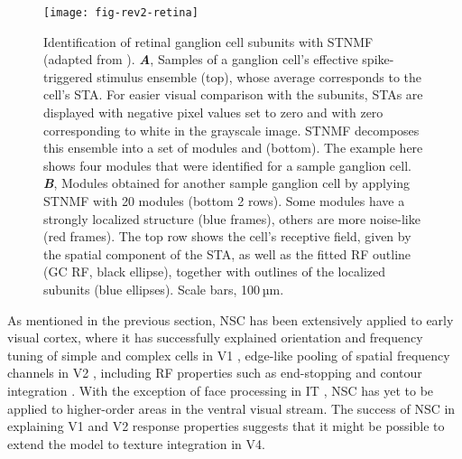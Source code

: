 \begin{figure}[ht]
	\centering
	\texttt{[image: fig-rev2-retina]}
    \caption{
    Identification of retinal ganglion cell subunits 
    with \ac{STNMF} (adapted  from \cite{Liu2017}).
    \textbf{\emph{A}},
	     Samples of a ganglion cell’s effective spike-triggered stimulus ensemble (top),
         whose average corresponds to the cell’s \ac{STA}.
         For easier visual comparison with the subunits,
         \acp{STA} are displayed with negative pixel values set to zero and
         with zero corresponding to white in the grayscale image.
         \ac{STNMF} decomposes this ensemble into a set of modules and 
          (bottom).
         The example here shows four modules that were identified for
         a sample ganglion cell.
    \textbf{\emph{B}},
         Modules obtained for another sample ganglion cell by applying \ac{STNMF}
         with 20 modules (bottom 2 rows). Some modules have a strongly localized structure 
         (blue frames), others are more noise-like (red frames).
         The top row shows the cell’s receptive field,
         given by the spatial component of the \ac{STA}, as well as the fitted \ac{RF} outline
         (GC RF, black ellipse), together with outlines of the localized subunits 
         (blue ellipses). Scale bars, 100 µm.
    }
	\label{fig:NMF|retina}
\end{figure}

As mentioned in the previous section,
\ac{NSC} has been extensively applied to early visual cortex,
where it has successfully explained 
orientation and frequency tuning of simple and complex cells in \ac{V1} \cite{Hoyer2003},
edge-like pooling of spatial frequency channels in V2 \cite{Hyvarinen2005},
including \ac{RF} properties such as end-stopping and contour integration 
\cite{HoyerHyvarinen2002}.
With the exception of face processing in \ac{IT}
\cite{LeeSeung1999,ChangTsao2017},
\ac{NSC} has yet to be applied to higher-order areas in the ventral visual stream.
The success of \ac{NSC} in explaining V1 and V2 response properties
suggests that it might be possible to extend the model to texture integration in
V4.

